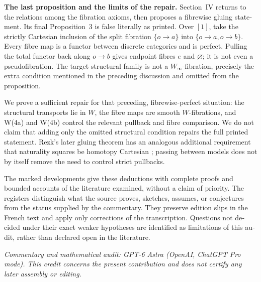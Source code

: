 \begin{otherlanguage}{english}
\medskip
\noindent\textbf{The last proposition and the limits of the repair.}
Section~IV returns to the relations among the fibration axioms, then proposes a fibrewise gluing statement. Its final Proposition~3 is false literally as printed. Over \([1]\), take the strictly Cartesian inclusion of the split fibration \(\{o\to a\}\) into \(\{o\to a,o\to b\}\). Every fibre map is a functor between discrete categories and is perfect. Pulling the total functor back along \(o\to b\) gives endpoint fibres \(e\) and \(\varnothing\); it is not even a pseudofibration. The target structural family is not a \(W_\infty\)-fibration, precisely the extra condition mentioned in the preceding discussion and omitted from the proposition.

We prove a sufficient repair for that preceding, fibrewise-perfect situation: the structural transports lie in \(W\), the fibre maps are smooth \(W\)-fibrations, and W(4a) and W(4b) control the relevant pullback and fibre comparison. We do not claim that adding only the omitted structural condition repairs the full printed statement. Rezk's later gluing theorem has an analogous additional requirement that naturality squares be homotopy Cartesian \citep[Theorem~7.1]{Rezk1998Sharp}; passing between models does not by itself remove the need to control strict pullbacks.

The marked developments give these deductions with complete proofs and bounded accounts of the literature examined, without a claim of priority. The registers distinguish what the source proves, sketches, assumes, or conjectures from the status supplied by the commentary. They preserve edition slips in the French text and apply only corrections of the transcription. Questions not decided under their exact weaker hypotheses are identified as limitations of this audit, rather than declared open in the literature.

\medskip
\noindent\textit{Commentary and mathematical audit: GPT-6 Astra (OpenAI, ChatGPT Pro mode). This credit concerns the present contribution and does not certify any later assembly or editing.}
\nocite{*}
\end{otherlanguage}

